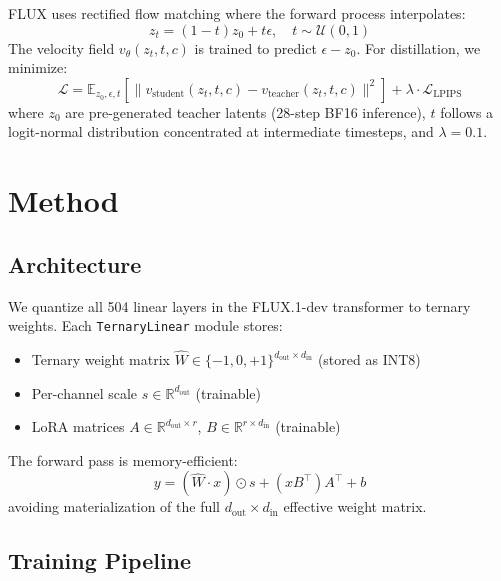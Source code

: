 \documentclass[10pt,twocolumn]{article}
\begin{document}
FLUX uses rectified flow matching where the forward process interpolates:
\begin{equation}
  z_t = (1 - t) z_0 + t \epsilon, \quad t \sim \mathcal{U}(0, 1)
\end{equation}
The velocity field $v_\theta(z_t, t, c)$ is trained to predict $\epsilon - z_0$.
For distillation, we minimize:
\begin{equation}
  \mathcal{L} = \mathbb{E}_{z_0, \epsilon, t} \left[ \| v_\text{student}(z_t, t, c) - v_\text{teacher}(z_t, t, c) \|^2 \right] + \lambda \cdot \mathcal{L}_{\text{LPIPS}}
\end{equation}
where $z_0$ are pre-generated teacher latents (28-step BF16 inference), $t$ follows a logit-normal distribution concentrated at intermediate timesteps, and $\lambda = 0.1$.

\section{Method}

\subsection{Architecture}

We quantize all 504 linear layers in the FLUX.1-dev transformer to ternary weights.
Each \texttt{TernaryLinear} module stores:
\begin{itemize}[nosep,leftmargin=*]
  \item Ternary weight matrix $\hat{W} \in \{-1,0,+1\}^{d_{\text{out}} \times d_{\text{in}}}$ (stored as INT8)
  \item Per-channel scale $s \in \mathbb{R}^{d_{\text{out}}}$ (trainable)
  \item LoRA matrices $A \in \mathbb{R}^{d_{\text{out}} \times r}$, $B \in \mathbb{R}^{r \times d_{\text{in}}}$ (trainable)
\end{itemize}

The forward pass is memory-efficient:
\begin{equation}
  y = (\hat{W} \cdot x) \odot s + (x B^\top) A^\top + b
\end{equation}
avoiding materialization of the full $d_{\text{out}} \times d_{\text{in}}$ effective weight matrix.

\subsection{Training Pipeline}
\end{document}
